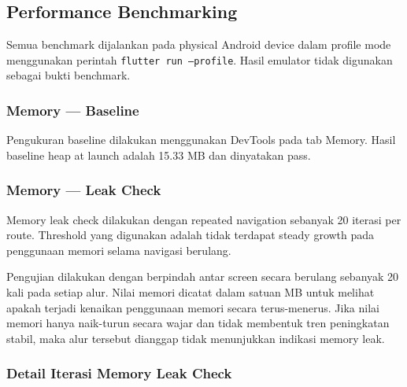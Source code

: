 \documentclass[11pt]{article}
\begin{document}
\subsection{Performance Benchmarking}

Semua benchmark dijalankan pada physical Android device dalam profile mode menggunakan perintah \texttt{flutter run --profile}. Hasil emulator tidak digunakan sebagai bukti benchmark.

\subsubsection{Memory --- Baseline}

Pengukuran baseline dilakukan menggunakan DevTools pada tab Memory. Hasil baseline heap at launch adalah 15.33 MB dan dinyatakan pass.

\subsubsection{Memory --- Leak Check}

Memory leak check dilakukan dengan repeated navigation sebanyak 20 iterasi per route. Threshold yang digunakan adalah tidak terdapat steady growth pada penggunaan memori selama navigasi berulang.


Pengujian dilakukan dengan berpindah antar screen secara berulang sebanyak 20 kali pada setiap alur. Nilai memori dicatat dalam satuan MB untuk melihat apakah terjadi kenaikan penggunaan memori secara terus-menerus. Jika nilai memori hanya naik-turun secara wajar dan tidak membentuk tren peningkatan stabil, maka alur tersebut dianggap tidak menunjukkan indikasi memory leak.

\subsubsection*{Detail Iterasi Memory Leak Check}
\end{document}
